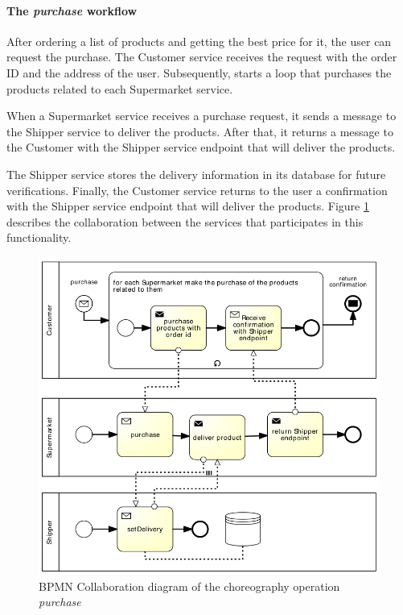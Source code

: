 \paragraph{The \emph{purchase} workflow\\}
After ordering a list of products and getting the best price for it, the user can request the purchase. The Customer service receives the request with the order ID and the address of the user. Subsequently, starts a loop that purchases the products related to each Supermarket service.

When a Supermarket service receives a purchase request, it sends a message to the Shipper service to deliver the products. After that, it returns a message to the Customer with the Shipper service endpoint that will deliver the products.

The Shipper service stores the delivery information in its database for future verifications. Finally, the Customer service returns to the user a confirmation with the Shipper service endpoint that will deliver the products. Figure \ref{purchaseworkflow} describes the collaboration between the services that participates in this functionality.

\begin{figure}[htbp]
\begin{center}
	\includegraphics{images/purchaseworkflow}
\caption{BPMN Collaboration diagram of the choreography operation \emph{purchase}}
\label{purchaseworkflow}
\end{center}
\end{figure}

